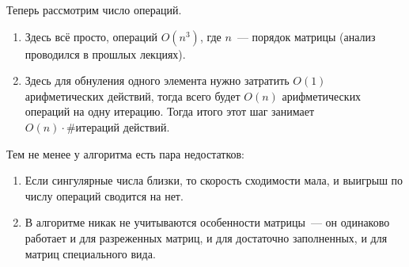 Теперь рассмотрим число операций.
\begin{enumerate}[label=\protect\circled{\arabic*}]
    \item Здесь всё просто, операций $O(n^3)$, где $n$~--- порядок матрицы (анализ проводился в прошлых лекциях).
    \item Здесь для обнуления одного элемента нужно затратить $O(1)$ арифметических действий, тогда всего будет $O(n)$ арифметических операций
          на одну итерацию. Тогда итого этот шаг занимает $O(n)\cdot \#\text{итераций}$ действий.
\end{enumerate}

\begin{remark}
    Тем не менее у алгоритма есть пара недостатков:
    \begin{enumerate}
        \item Если сингулярные числа близки, то скорость сходимости мала, и выигрыш по числу операций сводится на нет.
        \item В алгоритме никак не учитываются особенности матрицы~--- он одинаково работает и для разреженных матриц, и для достаточно заполненных, и
              для матриц специального вида.
    \end{enumerate}
\end{remark}

